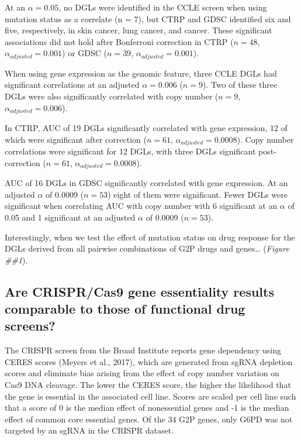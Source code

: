 \documentclass[man]{apa6}
\begin{document}
At an \(\alpha = 0.05\), no DGLs were identified in the CCLE screen when
using mutation status as a correlate (n = 7), but CTRP and GDSC
identified six and five, respectively, in skin cancer, lung cancer, and
cancer. These significant associations did not hold after Bonferroni
correction in CTRP (\(n = 48\), \(\alpha_{adjusted} = 0.001\)) or GDSC
(\(n = 39\), \(\alpha_{adjusted} = 0.001\)).

When using gene expression as the genomic feature, three CCLE DGLs had
significant correlations at an adjusted \(\alpha = 0.006\) (\(n = 9\)).
Two of these three DGLs were also significantly correlated with copy
number (\(n = 9\), \(\alpha_{adjusted} = 0.006\)).

In CTRP, AUC of 19 DGLs significantly correlated with gene expression,
12 of which were significant after correction (\(n = 61\),
\(\alpha_{adjusted} = 0.0008\)). Copy number correlations were
significant for 12 DGLs, with three DGLs significant post-correction
(\(n = 61\), \(\alpha_{adjusted} = 0.0008\)).

AUC of 16 DGLs in GDSC significantly correlated with gene expression. At
an adjusted \(\alpha\) of 0.0009 (\(n = 53\)) eight of them were
significant. Fewer DGLs were significant when correlating AUC with copy
number with 6 significant at an \(\alpha\) of 0.05 and 1 significant at
an adjusted \(\alpha\) of 0.0009 (\(n = 53\)).

Interestingly, when we test the effect of mutation status on drug
response for the DGLs derived from all pairwise combinations of G2P
drugs and genes\ldots{} (\emph{Figure \#\#1}).

\subsection{Are CRISPR/Cas9 gene essentiality results comparable to
those of functional drug
screens?}\label{are-crisprcas9-gene-essentiality-results-comparable-to-those-of-functional-drug-screens}

The CRISPR screen from the Broad Institute reports gene dependency using
CERES scores (Meyers et al., 2017), which are generated from sgRNA
depletion scores and eliminate bias arising from the effect of copy
number variation on Cas9 DNA cleavage. The lower the CERES score, the
higher the likelihood that the gene is essential in the associated cell
line. Scores are scaled per cell line such that a score of 0 is the
median effect of nonessential genes and -1 is the median effect of
common core essential genes. Of the 34 G2P genes, only G6PD was not
targeted by an sgRNA in the CRISPR dataset.
\end{document}
